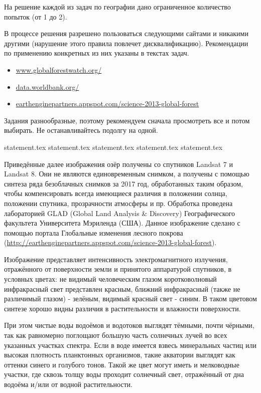 На решение каждой из задач по географии дано ограниченное количество попыток (от 1 до 2).

В процессе решения разрешено пользоваться следующими сайтами и никакими другими (нарушение этого правила повлечет дисквалификацию). Рекомендации по применению конкретных из них указаны в текстах задач.
\begin{itemize}
    \item \url{www.globalforestwatch.org/}
    \item \url{data.worldbank.org/}
    \item \url{earthenginepartners.appspot.com/science-2013-global-forest}
\end{itemize}

Задания разнообразные, поэтому рекомендуем сначала просмотреть все и потом выбирать.
Не останавливайтесь подолгу на одной.

{statement.tex}
{statement.tex}
{statement.tex}
{statement.tex}
{statement.tex}

Приведённые далее изображения озёр получены со спутников Landsat 7 и Landsat 8. Они не являются единовременным снимком, а получены с помощью синтеза ряда безоблачных снимков за 2017 год, обработанных таким образом, чтобы компенсировать всегда имеющиеся различия в положении солнца, положении спутника, прозрачности атмосферы и пр. Обработка проведена лабораторией GLAD (Global Land Analysis \& Discovery) Географического факультета Университета Мэриленда (США). Данное изображение сделано с помощью портала Глобальные изменения лесного покрова (\url{http://earthenginepartners.appspot.com/science-2013-global-forest}).

Изображение представляет интенсивность электромагнитного излучения, отражённого от поверхности земли и принятого аппаратурой спутников, в условных цветах: не видимый человеческим глазом коротковолновый инфракрасный свет представлен красным, ближний инфракрасный (также не различимый глазом) - зелёным, видимый красный свет - синим. В таком цветовом синтезе хорошо видны различия в растительности и влажности поверхности.

При этом чистые воды водоёмов и водотоков выглядят тёмными, почти чёрными, так как равномерно поглощают большую часть солнечных лучей во всех указанных участках спектра. Если в воде имеется взвесь минеральных частиц или высокая плотность планктонных организмов, такие акватории выглядят как оттенки синего и голубого тонов. Такой же цвет могут иметь и мелководные участки, где сквозь толщу воды проходит солнечный свет, отражённый от дна водоёма и/или от водной растительности.

